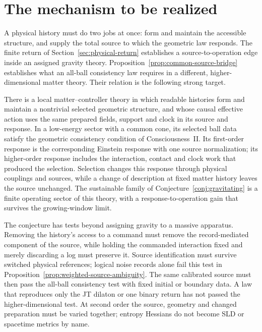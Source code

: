 \section{The mechanism to be realized}
\label{sec:source-principle}

A physical history must do two jobs at once: form and maintain the
accessible structure, and supply the total source to which the
geometric law responds. The finite return of Section~\ref{sec:physical-return}
establishes a source-to-operation edge inside an assigned gravity
theory. Proposition~\ref{prop:common-source-bridge} establishes what
an all-ball consistency law requires in a different, higher-dimensional
matter theory. Their relation is the following strong target.

\begin{conjecture}
\label{conj:common-action-selection}
There is a local matter--controller theory in which readable histories
form and maintain a nontrivial selected geometric structure, and whose
causal effective action uses the same prepared fields, support and clock
in its source and response. In a low-energy sector with a common cone,
its selected ball data satisfy the geometric consistency condition of
Consciousness~II. Its first-order response is the corresponding Einstein
response with one source normalization; its higher-order response includes
the interaction, contact and clock work that produced the selection.
Selection changes this response through physical couplings and sources,
while a change of description at fixed matter history leaves the source
unchanged. The sustainable family of Conjecture~\ref{conj:gravitating}
is a finite operating sector of this theory, with a response-to-operation
gain that survives the growing-window limit.
\end{conjecture}

The conjecture has tests beyond assigning gravity to a massive apparatus.
Removing the history's access to a command must remove the
record-mediated component of the source, while holding the commanded
interaction fixed and merely discarding a log must preserve it.
Source identification must survive switched physical references;
logical noise records alone fail this test in
Proposition~\ref{prop:weighted-source-ambiguity}.
The same calibrated source must then pass the all-ball consistency
test with fixed initial or boundary data. A law that reproduces only
the JT dilaton or one binary return has not passed the higher-dimensional
test. At second order the source, geometry and changed preparation must
be varied together; entropy Hessians do not become SLD or spacetime
metrics by name.

